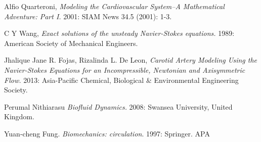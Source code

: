 \documentclass[12pt, a4paper]{article}
\theoremstyle{plain}
\theoremstyle{definition}
\theoremstyle{remark}
\begin{document}
























\newpage


 \begin{thebibliography}{1}
  Alfio Quarteroni, {\em Modeling the Cardiovascular System--A Mathematical Adventure: Part I.} 2001: SIAM News 34.5 (2001): 1-3.

   C Y Wang, {\em Exact solutions of the unsteady Navier-Stokes equations.} 1989: American Society of Mechanical Engineers.

    Jhalique Jane R. Fojas, Rizalinda L. De Leon, {\em Carotid Artery Modeling Using the Navier-Stokes Equations for an Incompressible, Newtonian and Axisymmetric Flow.} 2013: Asia-Pacific Chemical, Biological $\&$ Environmental Engineering Society.

   Perumal Nithiarasu {\em Biofluid Dynamics.} 2008: Swansea University, United Kingdom.

   Yuan-cheng Fung. {\em Biomechanics: circulation}. 1997: Springer.
APA	


  \end{thebibliography}
\end{document}
